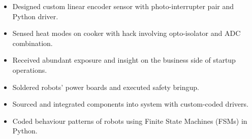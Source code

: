 \documentclass{resume}
\begin{document}
\begin{itemize}
  \item Designed custom linear encoder sensor with photo-interrupter pair and Python driver.
  \item Sensed heat modes on cooker with hack involving opto-isolator and ADC combination.
  \item Received abundant exposure and insight on the business side of startup operations.
\end{itemize}

\begin{itemize}
  \item Soldered robots' power boards and executed safety bringup.
  \item Sourced and integrated components into system with custom-coded drivers.
  \item Coded behaviour patterns of robots using Finite State Machines (FSMs) in Python.
\end{itemize}
\end{document}
